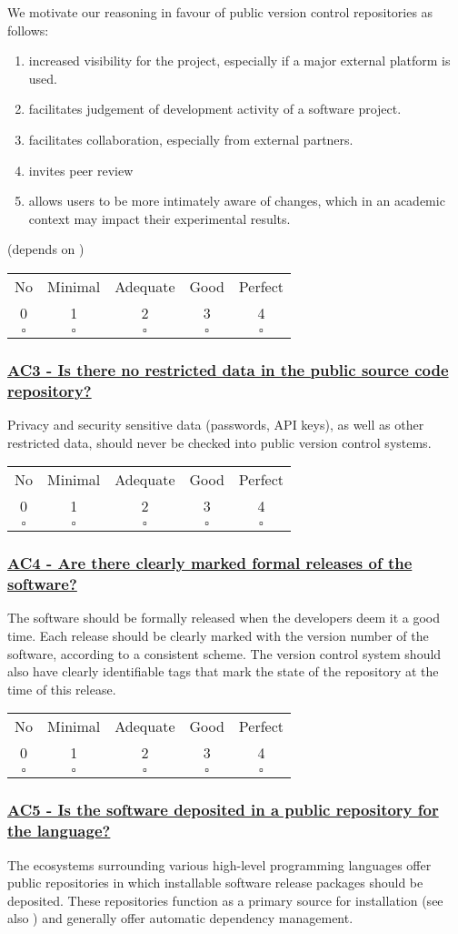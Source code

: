 \documentclass[a4paper,11pt]{article}
\newcommand{\criterion}[2]{\subsubsection*{\underline{#1 - #2}}\label{id:#1}}
\newcommand\CheckTable{%
  \begin{tabular}{ccccc}
    No & Minimal & Adequate & Good & Perfect \\
    0 & 1 & 2 & 3 & 4 \\
    \hline
    $\square$ & $\square$ & $\square$ & $\square$ & $\square$ \\
  \end{tabular}%
}
\newcommand{\refcrit}[1]{%
 \framebox[1.1\width]{\hyperref[id:#1]{#1}}
}
\begin{document}
We motivate our reasoning in favour of public version control repositories as follows:

\begin{enumerate}
    \item increased visibility for the project, especially if a major external platform is used.
    \item facilitates judgement of development activity of a software project.
    \item facilitates collaboration, especially from external partners.
    \item invites peer review
    \item allows users to be more intimately aware of changes, which in an
        academic context may impact their experimental results.
\end{enumerate}

(depends on \refcrit{AC1})

\CheckTable

\newcommand{\acThreeID}{AC3}
\newcommand{\acThreeText}{Is there no restricted data in the public source code repository?}
\criterion{\acThreeID}{\acThreeText}

Privacy and security sensitive data (passwords, API keys), as well as other
restricted data, should never be checked into public version control systems.

\CheckTable

\newcommand{\acFourID}{AC4}
\newcommand{\acFourText}{Are there clearly marked formal releases of the software?}
\criterion{\acFourID}{\acFourText}

The software should be formally released when the developers deem it a good
time. Each release should be clearly marked with the version number of the
software, according to a consistent scheme. The version control system should
also have clearly identifiable tags that mark the state of the repository at
the time of this release.

\CheckTable

\newcommand{\acFiveID}{AC5}
\newcommand{\acFiveText}{Is the software deposited in a public repository for the language?}
\criterion{\acFiveID}{\acFiveText}

The ecosystems surrounding various high-level programming languages offer
public repositories in which installable software release packages should be
deposited. These repositories function as a primary source for installation (see also
\refcrit{IS3}) and generally offer automatic dependency management.
\end{document}
